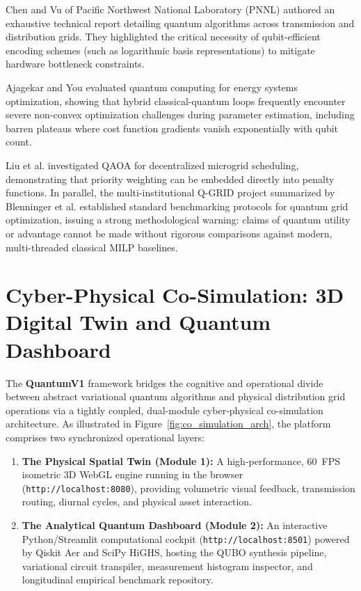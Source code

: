 \documentclass[11pt,a4paper]{article}
\theoremstyle{definition}
\theoremstyle{remark}
\begin{document}
Chen and Vu \cite{chen2025} of Pacific Northwest National Laboratory (PNNL) authored an exhaustive technical report detailing quantum algorithms across transmission and distribution grids. They highlighted the critical necessity of qubit-efficient encoding schemes (such as logarithmic basis representations) to mitigate hardware bottleneck constraints.

Ajagekar and You \cite{ajagekar2019} evaluated quantum computing for energy systems optimization, showing that hybrid classical-quantum loops frequently encounter severe non-convex optimization challenges during parameter estimation, including barren plateaus where cost function gradients vanish exponentially with qubit count.

Liu et al. \cite{liu2025} investigated QAOA for decentralized microgrid scheduling, demonstrating that priority weighting can be embedded directly into penalty functions. In parallel, the multi-institutional Q-GRID project summarized by Blenninger et al. \cite{blenninger2024} established standard benchmarking protocols for quantum grid optimization, issuing a strong methodological warning: claims of quantum utility or advantage cannot be made without rigorous comparisons against modern, multi-threaded classical MILP baselines.


\section{Cyber-Physical Co-Simulation: 3D Digital Twin and Quantum Dashboard}
\label{sec:twin_and_dashboard}

The \textbf{QuantumV1} framework bridges the cognitive and operational divide between abstract variational quantum algorithms and physical distribution grid operations via a tightly coupled, dual-module cyber-physical co-simulation architecture. As illustrated in Figure~\ref{fig:co_simulation_arch}, the platform comprises two synchronized operational layers:
\begin{enumerate}
    \item \textbf{The Physical Spatial Twin (Module 1):} A high-performance, 60~FPS isometric 3D WebGL engine running in the browser (\texttt{http://localhost:8080}), providing volumetric visual feedback, transmission routing, diurnal cycles, and physical asset interaction.
    \item \textbf{The Analytical Quantum Dashboard (Module 2):} An interactive Python/Streamlit computational cockpit (\texttt{http://localhost:8501}) powered by Qiskit Aer and SciPy HiGHS, hosting the QUBO synthesis pipeline, variational circuit transpiler, measurement histogram inspector, and longitudinal empirical benchmark repository.
\end{enumerate}
\end{document}
